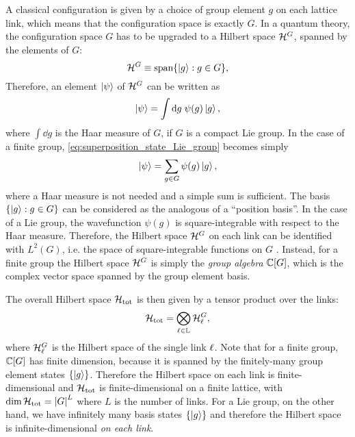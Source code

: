 \medskip

A classical configuration is given by a choice of group element $g$ on each lattice link,
which means that the configuration space is exactly $G$.
In a quantum theory, the configuration space $G$ has to be upgraded to a Hilbert space $\mathcal{H}^{G}$, spanned by the elements of $G$:
\begin{equation}
    \mathcal{H}^G \equiv \text{span}\{\ket{g} : g \in G\},
    \label{eq:single_link_Hilbert_space}
\end{equation}
Therefore, an element $\ket{\psi}$ of $\mathcal{H}^G$ can be written as
\begin{equation}
    \ket{\psi} = \int \dd g \; \psi(g) \ket{g},
    \label{eq:superposition_state_Lie_group}
\end{equation}
where $\int \dd g$ is the Haar measure of $G$, if $G$ is a compact Lie group.
In the case of a finite group, \eqref{eq:superposition_state_Lie_group} becomes simply
\begin{equation}
    \ket{\psi} = \sum_{g \in G} \psi(g) \ket{g},
\end{equation}
where a Haar measure is not needed and a simple sum is sufficient.
The basis $\{\ket{g} : g \in G\}$ can be considered as the analogous of a ``position basis''.
In the case of a Lie group, the wavefunction $\psi(g)$ is square-integrable with respect to the Haar measure.
Therefore, the Hilbert space $\mathcal{H}^{G}$ on each link can be identified with $L^2(G)$, i.e. the space of square-integrable functions on $G$ \cite{milstead2018qyangmills}.
Instead, for a finite group the Hilbert space $\mathcal{H}^{G}$ is simply the \emph{group algebra} $\mathbb{C}[G]$, which is the complex vector space spanned by the group element basis.

The overall Hilbert space $\mathcal{H}_{\text{tot}}$ is then given by a tensor product over the links:
\begin{equation}
    \mathcal{H}_{\text{tot}} = \bigotimes_{\ell \in \mathbb{L}} \mathcal{H}^{G}_{\ell},
\end{equation}
where $\mathcal{H}^{G}_{\ell}$ is the Hilbert space of the single link $\ell$.
Note that for a finite group, $\mathbb{C}[G]$ has finite dimension, because it is spanned by the finitely-many group element states $\{\ket{g}\}$.
Therefore the Hilbert space on each link is finite-dimensional and $\mathcal{H}_{\text{tot}}$ is finite-dimensional on a finite lattice, with $\dim \mathcal{H}_{\text{tot}} = \abs{G}^L$ where $L$ is the number of links.
For a Lie group, on the other hand, we have infinitely many basis states $\{\ket{g}\}$ and therefore the Hilbert space is infinite-dimensional \textit{on each link}.

